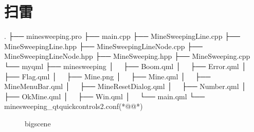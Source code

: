 ﻿




\FloatBarrier
\section{
扫雷
}\label{s100810t05}


{}\label{d000003}    %
\begin{thebookfilesourceonepathtree}[escapeinside={(*@}{@*)},
caption=GoodLuck,
numbers=none,
title=\treeindexnumbernameone \thetreeindexnumber
]
.
├── minesweeping.pro
├── main.cpp
├── MineSweepingLine.cpp
├── MineSweepingLine.hpp
├── MineSweepingLineNode.cpp
├── MineSweepingLineNode.hpp
├── MineSweeping.hpp
├── MineSweeping.cpp
└── myqml
    ├── minesweeping
    │   ├── Boom.qml
    │   ├── Error.qml
    │   ├── Flag.qml
    │   ├── Mine.png
    │   ├── Mine.qml
    │   ├── MineMenuBar.qml
    │   ├── MineResetDialog.qml
    │   ├── Number.qml
    │   ├── OkMine.qml
    │   ├── Win.qml
    │   └── main.qml
    └── minesweeping_qtquickcontrols2.conf(*@\marginpar[\hfill\setlength\fboxsep{2pt}\fbox{\footnotesize{\kaishu\parbox{1em}{\setlength{\baselineskip}{2pt}\treeindexnumbernameone}}\footnotesize{\thetreeindexnumber}}]{\setlength\fboxsep{2pt}\fbox{\footnotesize{\kaishu\parbox{1em}{\setlength{\baselineskip}{2pt}\treeindexnumbernameone}}\footnotesize{\thetreeindexnumber}}}@*)\end{thebookfilesourceonepathtree}          %
\addtocounter{lstlisting}{-1}   %


\begin{figure}[htb] %
\marginnote{\setlength\fboxsep{2pt}\fbox{\footnotesize{\kaishu\figurename\,}\footnotesize{\ref{p000065}}}}\centering %
\setlength\fboxsep{0pt} %
\caption{bigscene} %
\label{p000065} %
\end{figure}













